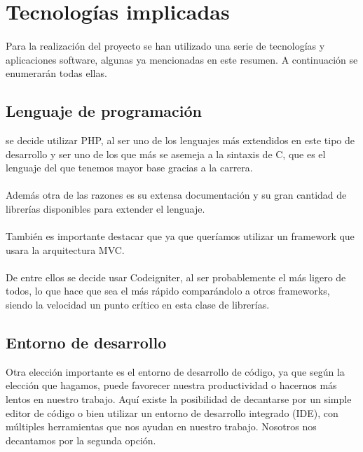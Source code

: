 \documentclass[a4paper,11pt]{article} %
\begin{document}
\section{Tecnologías implicadas}
\paragraph{}
Para la realización del proyecto se han utilizado una serie de tecnologías y aplicaciones software, algunas ya mencionadas en este resumen. A continuación se enumerarán todas ellas.

\subsection{Lenguaje de programación}

se decide utilizar PHP, al ser uno de los lenguajes más extendidos en este tipo de desarrollo y ser uno de los que más se asemeja a la sintaxis de C, que es el lenguaje del que tenemos mayor base gracias a la carrera.
\paragraph{}
Además otra de las razones es su extensa documentación y su gran cantidad de librerías disponibles para extender el lenguaje.
\paragraph{}
También es importante destacar que ya que queríamos utilizar un framework que usara la arquitectura MVC.
\paragraph{}
De entre ellos se decide usar Codeigniter, al ser probablemente el más ligero de todos, lo que hace que sea el más rápido comparándolo a otros frameworks, siendo la velocidad un punto crítico en esta clase de librerías. 

\subsection{Entorno de desarrollo}
Otra elección importante es el entorno de desarrollo de código, ya que según la elección que hagamos, puede favorecer nuestra productividad o hacernos más lentos en nuestro trabajo. Aquí existe la posibilidad de decantarse por un simple editor de código o bien utilizar un entorno de desarrollo integrado (IDE), con múltiples herramientas que nos ayudan en nuestro trabajo. Nosotros nos decantamos por la segunda opción.
\end{document}
